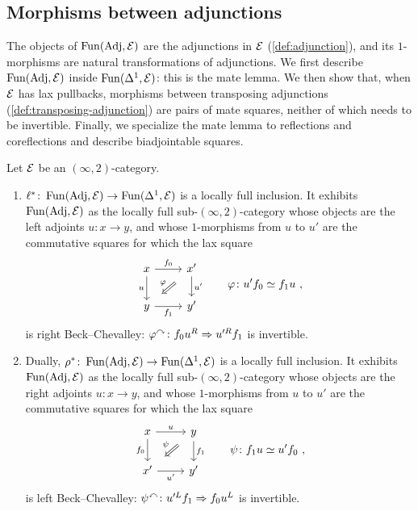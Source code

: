 \subsection{Morphisms between adjunctions}
\label{subsec:mates-morphisms}

%
The objects of $\operatorname{Fun}(\mathrm{Adj},\mathcal{E})$ are the adjunctions in $\mathcal{E}$
(\cref{def:adjunction}), and its $1$-morphisms are natural transformations of
adjunctions. We first describe $\operatorname{Fun}(\mathrm{Adj},\mathcal{E})$ inside $\operatorname{Fun}(\Delta^{1},\mathcal{E})$:
this is the mate lemma. We then show that, when $\mathcal{E}$ has lax pullbacks,
morphisms between transposing adjunctions (\cref{def:transposing-adjunction})
are pairs of mate squares, neither of which needs to be invertible.
Finally, we specialize the mate lemma to reflections and coreflections and
describe biadjointable squares.

\begin{lem}[mates]
\label{lem:mates}
%
Let $\mathcal{E}$ be an $(\infty,2)$-category.
\begin{enumerate}
\item
$\ell^{*}\colon \operatorname{Fun}(\mathrm{Adj},\mathcal{E}) \to \operatorname{Fun}(\Delta^{1},\mathcal{E})$
is a locally full inclusion. It exhibits $\operatorname{Fun}(\mathrm{Adj},\mathcal{E})$ as the locally full
sub-$(\infty,2)$-category whose objects are the left adjoints $u\colon x \to y$,
and whose $1$-morphisms from $u$ to $u'$ are the commutative squares for which
the lax square
\begin{equation*}
\begin{tikzcd}
x \ar[r, "f_{0}"] \ar[d, "u"'] & x' \ar[d, "u'"] \ar[dl, Rightarrow,
shorten=3mm, "\varphi"'] \\
y \ar[r, "f_{1}"'] & y'
\end{tikzcd}
\qquad \varphi\colon u'f_{0} \simeq f_{1}u \ ,
\end{equation*}
is right Beck--Chevalley:
${\varphi}^{\curvearrowright}\colon f_{0}u^{R} \Rightarrow u'^{R}f_{1}$
is invertible.
\item Dually,
$\rho^{*}\colon \operatorname{Fun}(\mathrm{Adj},\mathcal{E}) \to \operatorname{Fun}(\Delta^{1},\mathcal{E})$
is a locally full inclusion. It exhibits $\operatorname{Fun}(\mathrm{Adj},\mathcal{E})$ as the locally full
sub-$(\infty,2)$-category whose objects are the right adjoints $u\colon x \to
y$, and whose $1$-morphisms from $u$ to $u'$ are the commutative squares for
which the lax square
\begin{equation*}
\begin{tikzcd}
x \ar[r, "u"] \ar[d, "f_{0}"'] & y \ar[d, "f_{1}"] \ar[dl, Rightarrow,
shorten=3mm, "\psi"'] \\
x' \ar[r, "u'"'] & y'
\end{tikzcd}
\qquad \psi\colon f_{1}u \simeq u'f_{0} \ ,
\end{equation*}
is left Beck--Chevalley:
${\psi}^{\curvearrowleft}\colon u'^{L}f_{1} \Rightarrow f_{0}u^{L}$
is invertible.
\end{enumerate}
\end{lem}

